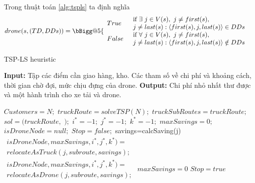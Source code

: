 \documentclass[a4paper,12pt]{report}
\makeatletter
\newcommand{\Vast}{\bBigg@{5}}
\makeatother
\begin{document}
Trong thuật toán  \ref{alg:tspls} ta định nghĩa 
$$
drone(s,(TD,DDs))= \Vast\{
\begin{array}{ll}
		True & \begin{array}{l}
		\text{if}	\	\exists \ j \in V(s),\ j \neq first(s), \\ j \neq last(s): \langle first(s),j,last(s) \rangle \in DDs
		\end{array}  \\
		False &  \begin{array}{l}
		\text{if}	\	\forall \ j \in V(s),\ j \neq first(s), \\ j \neq last(s): \langle first(s),j,last(s) \rangle \notin DDs
		\end{array}
\end{array}
$$
\begin{algorithm}[H]
\caption{TSP-LS heuristic}
\textbf{Input:} Tập các điểm cần giao hàng, kho. Các tham số về chi phí và khoảng cách, thời gian chờ đợi, mức chịu đựng của drone.
\textbf{Output:} Chi phí nhỏ nhất thư được và một hành trình cho xe tải và drone.
\begin{algorithmic}[1]
\State $Customers = N ;$
\State $truckRoute = solveTSP(N);$
\State $truckSubRoutes = {truckRoute};$
\State $sol = (truckRoute, $ $);$
\State $i^*=-1;$
\State $j^*=-1;$
\State $k^*=-1;$
\State $maxSavings = 0;$
\State $isDroneNode = null;$
\State $Stop = f alse;$
\Repeat
{}
\State savings=calcSaving(j)
\State $\begin{array}{l}
	isDroneNode,maxSavings,i^*,j^*,k^*)=\\
	relocateAsTruck(j,subroute,savings);
\end{array}$ 
\Else
\State $\begin{array}{l}
isDroneNode,maxSavings,i^*,j^*,k^*)= \\ relocateAsDrone(j,subroute,savings);
\end{array}$
\EndIf
\EndFor
{} 
\State $maxSavings=0$
\Else 
\State $Stop=true$
\EndIf
\EndFor
{}
\end{algorithmic}
\label{alg:tspls}
\end{algorithm}
\end{document}
